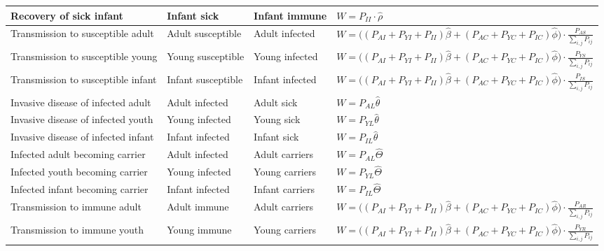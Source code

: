 \documentclass[10pt,a4paper]{article}
\begin{document}
\begin{appendices}
\begin{longtable}{p{3.5cm}|l|l|p{4cm}}
	Recovery of sick infant				& Infant sick			& Infant immune				& $W = P_{II} \cdot \hat{\rho}$										\\ \hline
	Transmission to	susceptible adult	& Adult susceptible		& Adult infected			& 
				$ W = \big( \left( P_{AI} + P_{YI} + P_{II} \right)\hat{\beta} + \left( P_{AC} + P_{YC} + P_{IC} \right) \hat{\phi} \big) \cdot \frac{P_{AS}}{\sum_{i,j}P_{ij}} $
																																									\\ \hline
	Transmission to	susceptible young 	& Young susceptible		& Young infected			& 
				$W = \big( \left( P_{AI} + P_{YI} + P_{II} \right)\hat{\beta} + \left( P_{AC} + P_{YC} + P_{IC} \right) \hat{\phi} \big) \cdot \frac{P_{YS}}{\sum_{i,j}P_{ij}}$																																																	\\ \hline
	Transmission to susceptible infant	& Infant susceptible	& Infant infected			& 
				$W = \big( \left( P_{AI} + P_{YI} + P_{II} \right)\hat{\beta} + \left( P_{AC} + P_{YC} + P_{IC} \right) \hat{\phi} \big) \cdot \frac{P_{IS}}{\sum_{i,j}P_{ij}}$																																																	\\ \hline
	Invasive disease of	infected adult	& Adult infected		& Adult sick				& $W = P_{AL} \hat{\theta}$												\\ \hline
	Invasive disease of infected youth	& Young infected		& Young sick				& $W = P_{YL} \hat{\theta}$												\\ \hline
	Invasive disease of infected infant & Infant infected		& Infant sick				& $W = P_{IL} \hat{\theta}$												\\ \hline
	Infected adult becoming carrier	& Adult infected		& Adult carriers			& $W = P_{AL} \hat{\Theta}$												\\ \hline
	Infected youth becoming carrier	& Young infected		& Young carriers			& $W = P_{YL} \hat{\Theta}$												\\ \hline
	Infected infant becoming carrier	& Infant infected		& Infant carriers			& $W = P_{IL} \hat{\Theta}$												\\ \hline
	Transmission to immune adult		& Adult immune			& Adult carriers			&
				$W = \big( \left( P_{AI} + P_{YI} + P_{II} \right)\hat{\beta} + \left( P_{AC} + P_{YC} + P_{IC} \right) \hat{\phi} \big) \cdot \frac{P_{AR}}{\sum_{i,j}P_{ij}}$																																																	\\ \hline
	Transmission to immune youth		& Young immune			& Young carriers			& 
				$W = \big( \left( P_{AI} + P_{YI} + P_{II} \right)\hat{\beta} + \left( P_{AC} + P_{YC} + P_{IC} \right) \hat{\phi} \big) \cdot \frac{P_{YR}}{\sum_{i,j}P_{ij}}$																																																	\\ \hline

\end{longtable}
\end{appendices}
\end{document}
